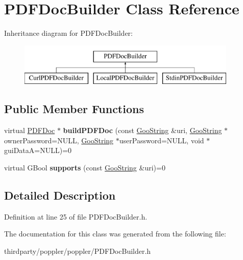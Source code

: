 \hypertarget{class_p_d_f_doc_builder}{}\section{P\+D\+F\+Doc\+Builder Class Reference}
\label{class_p_d_f_doc_builder}
Inheritance diagram for P\+D\+F\+Doc\+Builder\+:\begin{figure}[H]
\begin{center}
\leavevmode
\includegraphics[height=2.000000cm]{class_p_d_f_doc_builder}
\end{center}
\end{figure}
\subsection*{Public Member Functions}
\begin{DoxyCompactItemize}
\item 
\mbox{\label{class_p_d_f_doc_builder_a7f718143c7e6d9b67159ee6da7417491}} 
virtual \hyperlink{class_p_d_f_doc}{P\+D\+F\+Doc} $\ast$ {\bfseries build\+P\+D\+F\+Doc} (const \hyperlink{class_goo_string}{Goo\+String} \&uri, \hyperlink{class_goo_string}{Goo\+String} $\ast$owner\+Password=N\+U\+LL, \hyperlink{class_goo_string}{Goo\+String} $\ast$user\+Password=N\+U\+LL, void $\ast$gui\+DataA=N\+U\+LL)=0
\item 
\mbox{\label{class_p_d_f_doc_builder_a84308e47f5fa7026b99712add53b0d19}} 
virtual G\+Bool {\bfseries supports} (const \hyperlink{class_goo_string}{Goo\+String} \&uri)=0
\end{DoxyCompactItemize}


\subsection{Detailed Description}


Definition at line 25 of file P\+D\+F\+Doc\+Builder.\+h.



The documentation for this class was generated from the following file\+:\begin{DoxyCompactItemize}
\item 
thirdparty/poppler/poppler/P\+D\+F\+Doc\+Builder.\+h\end{DoxyCompactItemize}
